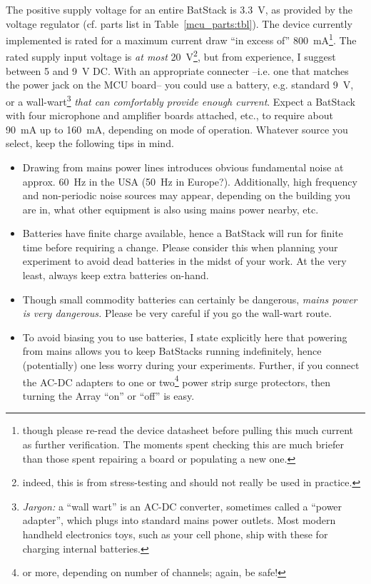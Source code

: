 \documentclass[letterpaper]{article}
\begin{document}
The positive supply voltage for an entire BatStack is 3.3~V, as
provided by the voltage regulator (cf. parts list in
Table~\ref{mcu_parts:tbl}). The device currently implemented is rated
for a maximum current draw ``in excess of'' 800~mA\footnote{though
  please re-read the device datasheet before pulling this much current
  as further verification. The moments spent checking this are much
  briefer than those spent repairing a board or populating a new
  one.}. The rated supply input voltage is \textit{at most}
20~V\footnote{indeed, this is from stress-testing and should not
  really be used in practice.}, but from experience, I suggest between
5 and 9~V DC. With an appropriate connecter --i.e. one that matches
the power jack on the MCU board-- you could use a battery,
e.g. standard 9~V, or a wall-wart\footnote{\textit{Jargon:} a ``wall
  wart'' is an AC-DC converter, sometimes called a ``power adapter'',
  which plugs into standard mains power outlets. Most modern handheld
  electronics toys, such as your cell phone, ship with these for
  charging internal batteries.} \textit{that can comfortably provide
  enough current}. Expect a BatStack with four microphone and
amplifier boards attached, etc., to require about 90~mA up to 160~mA,
depending on mode of operation. Whatever source you select, keep the
following tips in mind.
\begin{itemize}
\item Drawing from mains power lines introduces obvious fundamental
  noise at approx. 60~Hz in the USA (50~Hz in Europe?). Additionally,
  high frequency and non-periodic noise sources may appear, depending
  on the building you are in, what other equipment is also using mains
  power nearby, etc.

\item Batteries have finite charge available, hence a BatStack will
  run for finite time before requiring a change. Please consider this
  when planning your experiment to avoid dead batteries in the midst
  of your work. At the very least, always keep extra batteries
  on-hand.

\item Though small commodity batteries can certainly be dangerous,
  \textit{mains power is very dangerous.} Please be very careful if
  you go the wall-wart route.

\item To avoid biasing you to use batteries, I state explicitly here
  that powering from mains allows you to keep BatStacks running
  indefinitely, hence (potentially) one less worry during your
  experiments. Further, if you connect the AC-DC adapters to one or
  two\footnote{or more, depending on number of channels; again, be
    safe!} power strip surge protectors, then turning the Array ``on''
  or ``off'' is easy.
\end{itemize}
\end{document}
